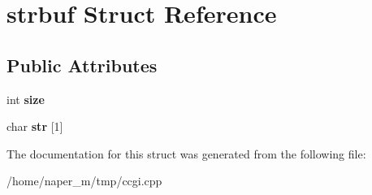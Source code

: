 \hypertarget{structstrbuf}{\section{strbuf Struct Reference}
\label{structstrbuf}
}
\subsection*{Public Attributes}
\begin{DoxyCompactItemize}
\item 
\hypertarget{structstrbuf_a991084579d19d169fb4b39bc086bcc08}{int {\bfseries size}}\label{structstrbuf_a991084579d19d169fb4b39bc086bcc08}

\item 
\hypertarget{structstrbuf_a6ac4dc671351c023ab60ee651d138421}{char {\bfseries str} \mbox{[}1\mbox{]}}\label{structstrbuf_a6ac4dc671351c023ab60ee651d138421}

\end{DoxyCompactItemize}


The documentation for this struct was generated from the following file\-:\begin{DoxyCompactItemize}
\item 
/home/naper\-\_\-m/tmp/ccgi.\-cpp\end{DoxyCompactItemize}
